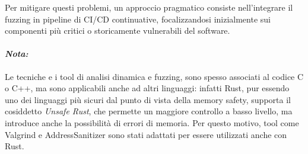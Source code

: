 Per mitigare questi problemi, un approccio pragmatico consiste nell'integrare il
fuzzing in pipeline di CI/CD continuative, focalizzandosi inizialmente sui
componenti più critici o storicamente vulnerabili del software.

\noindent

\paragraph{\textit{Nota:}}
Le tecniche e i tool di analisi dinamica e fuzzing, sono spesso associati al codice
C o C++, ma sono applicabili anche ad altri linguaggi: infatti Rust, pur essendo
uno dei linguaggi più sicuri dal punto di vista della memory safety, supporta il
cosiddetto \textit{Unsafe Rust}, che permette un maggiore controllo a basso livello,
ma introduce anche la possibilità di errori di memoria. Per questo motivo, tool
come Valgrind e AddressSanitizer sono stati adattati per essere utilizzati anche
con Rust.\cite{valgrind_rust}\cite{rust_manual_san}